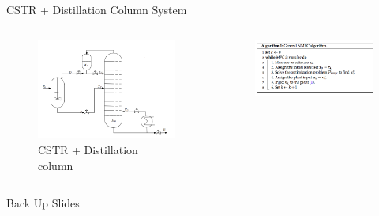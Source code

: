 \documentclass{beamer}
\begin{document}
\begin{frame}{CSTR + Distillation Column System}
	\begin{columns}
		\begin{column}{0.5\textwidth}
			\begin{figure}[H]
				\includegraphics[scale=0.6]{process}
				\caption{CSTR + Distillation column}
			\end{figure}
		\end{column}
		\begin{column}{0.5\textwidth}
			\begin{figure}[H]
				\centering
				\includegraphics[scale=0.3]{NMPC}
			\end{figure}
			
		\end{column}
	\end{columns}
\end{frame}
\begin{frame}
Back Up Slides
\end{frame}
\end{document}
